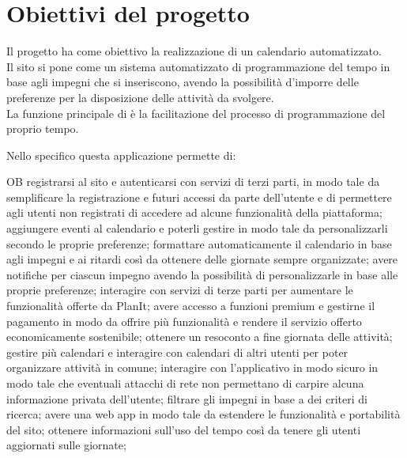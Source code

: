 \section{Obiettivi del progetto}
\label{sec:ObiettiviProgetto}
Il progetto ha come obiettivo la realizzazione di un calendario automatizzato.\\
Il sito si pone come un sistema automatizzato di programmazione del tempo in base agli impegni che si inseriscono, avendo la possibilità d'imporre delle preferenze per la disposizione delle attività da svolgere.\\
La funzione principale di \nome è la facilitazione del processo di programmazione del proprio tempo.

\vspace{0.5cm}

Nello specifico questa applicazione permette di:
\begin {listaPersonale} {OB}
       registrarsi al sito e autenticarsi con servizi di terzi parti, in modo tale da semplificare la registrazione e futuri accessi da parte dell'utente e di permettere agli utenti non registrati di accedere ad alcune funzionalità della piattaforma;
       aggiungere eventi al calendario e poterli gestire in modo tale da personalizzarli secondo le proprie preferenze;
       formattare automaticamente il calendario in base agli impegni e ai ritardi così da ottenere delle giornate sempre organizzate;
       avere notifiche per ciascun impegno avendo la possibilità di personalizzarle in base alle proprie preferenze;
       interagire con servizi di terze parti per aumentare le funzionalità offerte da PlanIt;
       avere accesso a funzioni premium e gestirne il pagamento in modo da offrire più funzionalità e rendere il servizio offerto economicamente sostenibile;
       ottenere un resoconto a fine giornata delle attività;
       gestire più calendari e interagire con calendari di altri utenti per poter organizzare attività in comune;
       interagire con l'applicativo in modo sicuro in modo tale che eventuali attacchi di rete non permettano di carpire alcuna informazione privata dell'utente;
       filtrare gli impegni in base a dei criteri di ricerca;
       avere una web app in modo tale da estendere le funzionalità e portabilità del sito;
       ottenere informazioni sull'uso del tempo così da tenere gli utenti aggiornati sulle giornate;
\end{listaPersonale}
